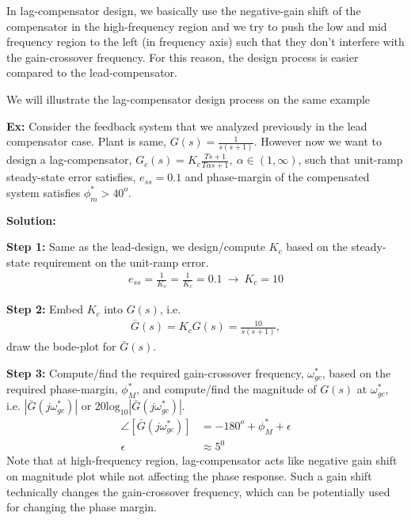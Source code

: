 \documentclass[twoside]{article}
\begin{document}
In lag-compensator design, we basically use the negative-gain shift of
the compensator in the high-frequency region and we try to push the
low and mid frequency region to the left (in frequency axis) such that 
they don't interfere with the gain-crossover frequency. For this
reason, the design process is easier compared to the lead-compensator. 

We will illustrate the lag-compensator design process on the same example 

\vspace{6pt}

\textbf{Ex:} Consider the feedback system that we analyzed
previously in the lead compensator case. Plant is same, 
$G(s) = \frac{1}{s (s+1)}$. However now we want to
design a lag-compensator, $G_c(s) = K_c \frac{T s + 1}{T \alpha s + 1}
, \ \alpha \in (1,\infty)$, such that unit-ramp steady-state error satisfies, $e_{ss} =
0.1$ and phase-margin of the compensated system satisfies $\phi_m^*
> 40^o$. 

\textbf{Solution:}

\textbf{Step 1:} Same as the lead-design, we design/compute $K_c$ based on the steady-state 
requirement on the unit-ramp error.  
%
\begin{align}
   e_{ss} = \frac{1}{K_v} = \frac{1}{K_c} = 0.1 \ \rightarrow \ K_c = 10
\end{align}

\textbf{Step 2:} Embed $K_c$ into $G(s)$, i.e. 
%
\begin{align*}
  \bar{G}(s) = K_c G(s) = \frac{10}{s (s+1)} ,
\end{align*} 
%
draw the bode-plot for $\bar{G}(s)$. 

\textbf{Step 3:} Compute/find the required gain-crossover
frequency, $\omega_{gc}^*$, based on
the required phase-margin, $\phi^*_M$, and compute/find 
the magnitude of $G(s)$ at $\omega_{gc}^*$, i.e. 
$| \bar{G}(j  \omega_{gc}^*) | $ or $20 \mathrm{log}_{10} | \bar{G}(j  \omega_{gc}^*) |$.
%
\begin{align*}
  \angle [ \bar{G}(j  \omega_{gc}^*) ] &= -180^o + \phi_M^* + \epsilon
  \\
  \epsilon &\approx 5^0
\end{align*}
%
Note that at high-frequency 
region, lag-compensator acts like negative gain 
shift on magnitude plot while not affecting the 
phase response. Such a gain shift technically 
changes the gain-crossover frequency, which
can be potentially used for changing the phase 
margin. 
\end{document}
